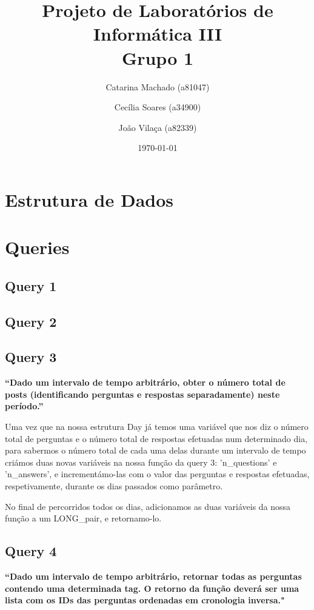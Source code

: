 \documentclass[a4paper]{report}
\title{Projeto de Laboratórios de Informática III\\Grupo 1}
\author{Catarina Machado (a81047) \and Cecília Soares (a34900) \and João Vilaça (a82339)}
\date{\today}
\begin{document}
\maketitle

\tableofcontents

\chapter{Estrutura de Dados}

\chapter{Queries}

\section{Query 1}
\label{sec:query1}

\section{Query 2}
\label{sec:query2}

\section{Query 3}
\label{sec:query3}

\textbf{“Dado um intervalo de tempo arbitrário,
obter o número total de posts (identificando perguntas e respostas separadamente) neste período.”}

Uma vez que na nossa estrutura Day já temos uma variável que nos diz o número total de perguntas
e o número total de respostas efetuadas num determinado dia, para sabermos o
número total de cada uma delas durante um intervalo de tempo criámos duas novas
variáveis na nossa função da query 3: \textsf{'n\_questions'} e \textsf{'n\_answers'},
e incrementámo-las com o valor das perguntas e respostas efetuadas, respetivamente,
durante os dias passados como parâmetro.

No final de percorridos todos os dias, adicionamos as duas variáveis da nossa função a um LONG\_pair, e retornamo-lo.


\section{Query 4}
\label{sec:query4}

\textbf{“Dado um intervalo de tempo arbitrário, retornar todas as perguntas contendo uma determinada tag.
O retorno da função deverá ser uma lista com os IDs das perguntas ordenadas em cronologia inversa."}
\end{document}
